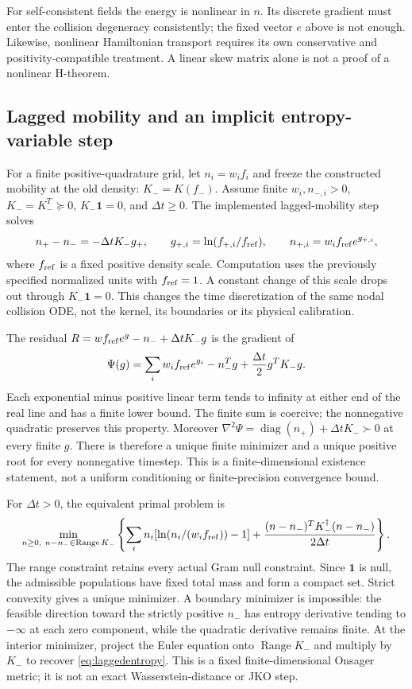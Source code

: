 \documentclass[11pt,letterpaper]{article}
\begin{document}
For self-consistent fields the energy is nonlinear in $n$. Its discrete gradient
must enter the collision degeneracy consistently; the fixed vector $e$ above is
not enough. Likewise, nonlinear Hamiltonian transport requires its own
conservative and positivity-compatible treatment. A linear skew matrix alone
is not a proof of a nonlinear H-theorem.

\subsection*{Lagged mobility and an implicit entropy-variable step}
For a finite positive-quadrature grid, let $n_i=w_i f_i$ and freeze the
constructed mobility at the old density: $K_-=K(f_-)$. Assume finite
$w_i,n_{-,i}>0$, $K_-=K_-^T\succeq0$, $K_-\bm1=0$, and $\Delta t\ge0$.
The implemented lagged-mobility step solves
\begin{equation}
 n_+-n_-=-\Delta t K_-g_+,
 \qquad g_{+,i}=\ln(f_{+,i}/f_{\rm ref}),
 \qquad n_{+,i}=w_i f_{\rm ref}e^{g_{+,i}},
 \label{eq:laggedentropy}
\end{equation}
where $f_{\rm ref}$ is a fixed positive density scale. Computation uses the
previously specified normalized units with $f_{\rm ref}=1$. A constant change
of this scale drops out through $K_-\bm1=0$. This changes the time
discretization of the same nodal collision ODE, not the kernel, its boundaries
or its physical calibration.

The residual $R=w f_{\rm ref}e^g-n_-+\Delta t K_-g$ is the gradient of
\begin{equation}
 \Psi(g)=\sum_i w_i f_{\rm ref}e^{g_i}-n_-^Tg
        +\frac{\Delta t}{2}g^TK_-g.
 \label{eq:laggeddualobjective}
\end{equation}
Each exponential minus positive linear term tends to infinity at either end
of the real line and has a finite lower bound. The finite sum is coercive;
the nonnegative quadratic preserves this property. Moreover
$\nabla^2\Psi=\operatorname{diag}(n_+)+\Delta t K_-\succ0$ at every finite
$g$. There is therefore a unique finite minimizer and a unique positive root
for every nonnegative timestep. This is a finite-dimensional existence
statement, not a uniform conditioning or finite-precision convergence bound.

For $\Delta t>0$, the equivalent primal problem is
\begin{equation}
 \min_{n\ge0,\ n-n_-\in\operatorname{Range}K_-}
 \left\{\sum_i n_i[\ln(n_i/(w_i f_{\rm ref}))-1]
  +\frac{(n-n_-)^TK_-^\dagger(n-n_-)}{2\Delta t}\right\}.
 \label{eq:laggedprimalobjective}
\end{equation}
The range constraint retains every actual Gram null constraint. Since
$\bm1$ is null, the admissible populations have fixed total mass and form a
compact set. Strict convexity gives a unique minimizer. A boundary minimizer
is impossible: the feasible direction toward the strictly positive $n_-$ has
entropy derivative tending to $-\infty$ at each zero component, while the
quadratic derivative remains finite. At the interior minimizer, project the
Euler equation onto $\operatorname{Range}K_-$ and multiply by $K_-$ to recover
\eqref{eq:laggedentropy}. This is a fixed finite-dimensional Onsager metric;
it is not an exact Wasserstein-distance or JKO step.
\end{document}
